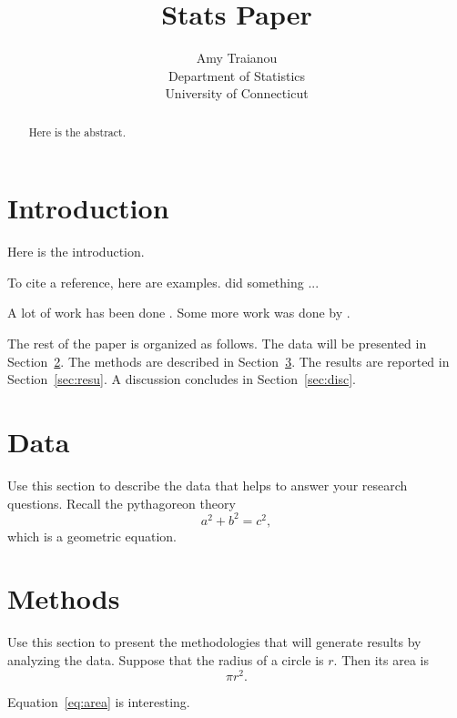 \documentclass[12pt, titlepage]{article}
\title{Stats Paper}
\author{Amy Traianou\\
  Department of Statistics\\
  University of Connecticut
}
\begin{document}
\maketitle

\begin{abstract}
Here is the abstract. 
\lipsum[1] 
\end{abstract}


\section{Introduction}
\label{sec:intro}

Here is the introduction.

\lipsum[1-3]

To cite a reference, here are examples.
\citet{mehta1991epidemiology} did something ... \lipsum[1]

A lot of work has been done \citep[e.g.,][]{mehta1991epidemiology}.
\lipsum[2]
Some more work was done by
\citet{jewell2004statistics}. 


The rest of the paper is organized as follows.
The data will be presented in Section~\ref{sec:data}.
The methods are described in Section~\ref{sec:meth}.
The results are reported in Section~\ref{sec:resu}.
A discussion concludes in Section~\ref{sec:disc}.


\section{Data}
\label{sec:data}

Use this section to describe the data that helps to answer your research
questions. Recall the pythagoreon theory
\begin{equation}
  \label{eq:pythag}
  a^2 + b^2 = c^2,
\end{equation}
which is a geometric equation.

\section{Methods}
\label{sec:meth}

Use this section to present the methodologies that will generate results by
analyzing the data. Suppose that the radius of a circle is $r$. Then its area is
\begin{equation}
  \label{eq:area}
  \pi r^2.
\end{equation}

Equation~\eqref{eq:area} is interesting. \lipsum[1-4]
\end{document}
